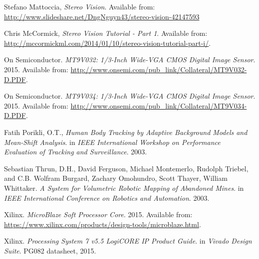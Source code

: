 \begin{thebibliography}{9}
Stefano Mattoccia, \textit{Stereo Vision}. Available from: \url{http://www.slideshare.net/DngNguyn43/stereo-vision-42147593}

Chris McCormick, \textit{Stereo Vision Tutorial  - Part 1}. Available from: \url{http://mccormickml.com/2014/01/10/stereo-vision-tutorial-part-i/}.

On Semiconductor. 
\textit{MT9V032: 1/3-Inch Wide-VGA CMOS Digital Image Sensor}. 2015. 
Available from: \url{http://www.onsemi.com/pub_link/Collateral/MT9V032-D.PDF}.

On Semiconductor. 
\textit{MT9V034: 1/3-Inch Wide-VGA CMOS Digital Image Sensor}. 2015. 
Available from: \url{http://www.onsemi.com/pub_link/Collateral/MT9V034-D.PDF}.

Fatih Porikli, O.T.,
\textit{Human Body Tracking by Adaptive Background Models and Mean-Shift Analysis}.
in \textit{IEEE International Workshop on Performance Evaluation of Tracking and Surveillance}. 2003.

Sebastian Thrun, D.H., David Ferguson, Michael Montemerlo, Rudolph Triebel, and C.B. Wolfram Burgard, Zachary Omohundro, Scott Thayer, William Whittaker.
\textit{A System for Volumetric Robotic Mapping of Abandoned Mines}. 
in \textit{IEEE International Conference on Robotics and Automation}. 2003.

Xilinx. \textit{MicroBlaze Soft Processor Core}. 2015. Available from: \url{https://www.xilinx.com/products/design-tools/microblaze.html}.

Xilinx. \textit{Processing System 7 v5.5 LogiCORE IP Product Guide}. in \textit{Vivado Design Suite}. PG082 datasheet, 2015.

\end{thebibliography}

